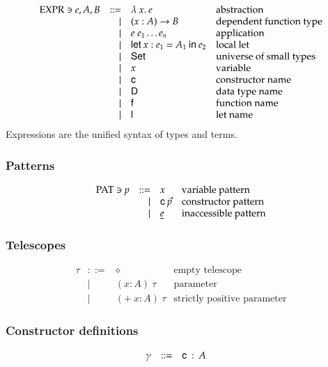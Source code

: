 \[
\begin{array}{lrll}
\operatorname{EXPR} \ni e,A,B & ::= & \lambda\: x .\:{e} & \mbox{abstraction}\\
& \mid & ( x : A ) \rightarrow{B} & \mbox{dependent function type}\\
& \mid & e \; e_1 \ldots e_n & \mbox{application}\\
& \mid & \mathsf{let}\: x : e_1 = A_1 \: \mathsf{in}\:{e_2} & \mbox{local let}\\ 
& \mid & \mathsf{Set} & \mbox{universe of small types}\\
& \mid & x & \mbox{variable}\\
& \mid & \mathsf{c} & \mbox{constructor name}\\
& \mid & \mathsf{D} & \mbox{data type name}\\
& \mid & \mathsf{f} & \mbox{function name}\\
& \mid & \mathsf{l} & \mbox{let name}
\end{array}
\]
Expressions are the unified syntax of types and terms.

\subsubsection{Patterns}
\[
\begin{array}{lrll}
\operatorname{PAT} \ni p & ::= & x & \mbox{variable pattern}\\
& \mid & \mathsf{c} \: \vec{p} & \mbox{constructor pattern}\\
& \mid & \underline{e} & \mbox{inaccessible pattern}\\
\end{array}
\]

\subsubsection{Telescopes}
\[
\begin{array}{lrll}
\tau & ::= & \diamond & \mbox{empty telescope}\\
& \mid & ( x : A ) \: \tau & \mbox{parameter}\\
& \mid & ( + \: x : A ) \: \tau & \mbox{strictly positive parameter}
\end{array}
\]

\subsubsection{Constructor definitions}
\[
\begin{array}{lrll}
\gamma &  ::= & \mathsf{c} \: : \: A & 
\end{array}
\]

